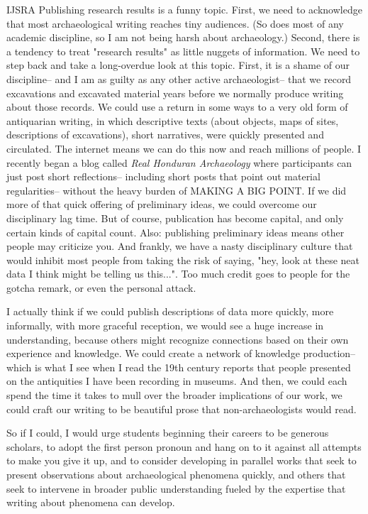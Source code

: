 \begin{labeling}{IJSRA}
Publishing research results is a funny topic. First, we need to acknowledge that most archaeological writing reaches tiny audiences. (So does most of any academic discipline, so I am not being harsh about archaeology.) Second, there is a tendency to treat "research results" as little nuggets of information. We need to step back and take a long-overdue look at this topic. First, it is a shame of our discipline-- and I am as guilty as any other active archaeologist-- that we record excavations and excavated material years before we normally produce writing about those records. We could use a return in some ways to a very old form of antiquarian writing, in which descriptive texts (about objects, maps of sites, descriptions of excavations), short narratives, were quickly presented and circulated. The internet means we can do this now and reach millions of people. I recently began a blog called \textit{Real Honduran Archaeology} where participants can just post short reflections-- including short posts that point out material regularities-- without the heavy burden of {\scshape MAKING A BIG POINT}. If we did more of that quick offering of preliminary ideas, we could overcome our disciplinary lag time. But of course, publication has become capital, and only certain kinds of capital count. Also: publishing preliminary ideas means other people may criticize you. And frankly, we have a nasty disciplinary culture that would inhibit most people from taking the risk of saying, "hey, look at these neat data I think might be telling us this...". Too much credit goes to people for the gotcha remark, or even the personal attack. 

I actually think if we could publish descriptions of data more quickly, more informally, with more graceful reception, we would see a huge increase in understanding, because others might recognize connections based on their own experience and knowledge. We could create a network of knowledge production-- which is what I see when I read the 19th century reports that people presented on the antiquities I have been recording in museums. And then, we could each spend the time it takes to mull over the broader implications of our work, we could craft our writing to be beautiful prose that non-archaeologists would read.

So if I could, I would urge students beginning their careers to be generous scholars, to adopt the first person pronoun and hang on to it against all attempts to make you give it up, and to consider developing in parallel works that seek to present observations about archaeological phenomena quickly, and others that seek to intervene in broader public understanding fueled by the expertise that writing about phenomena can develop.


\end{labeling}
